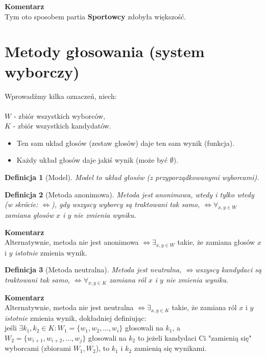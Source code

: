 \documentclass[12pt,a4paper]{article}
\theoremstyle{break}
\newcommand{\Komentarz}[1]{
	\begin{mdframed}[style=zadanie]
		\textbf{Komentarz}\\
		#1
	\end{mdframed}
	}
\newtheorem{definition}{Definicja}[section]
\newcommand{\witw}{$\Leftrightarrow$}
\begin{document}
\Komentarz{Tym oto sposobem partia \textbf{Sportowcy} zdobyła większość.}

	
\newpage

\section{Metody głosowania (system wyborczy)}

Wprowadźmy kilka oznaczeń, niech: \\
\\ $W$ - zbiór wszystkich wyborców, \\
$K$ - zbiór wszystkich kandydatów.
\begin{itemize}
	\item Ten sam układ głosów (zestaw głosów) daje ten sam wynik (funkcja).
	\item Każdy układ głosów daje jakiś wynik (może być $\emptyset$).
\end{itemize}

\begin{definition}[Model]
	Model to układ głosów (z przyporządkowanymi wyborcami).
\end{definition}

\begin{definition}[Metoda anonimowa]
	Metoda jest anonimowa, \textit{wtedy i tylko wtedy} (w skrócie: \witw), gdy wszyscy wyborcy są traktowani tak samo, \witw $\forall_{x,y \in W}$ zamiana głosów $x$ i $y$ nie zmienia wyniku.
\end{definition}

\Komentarz{Alternatywnie, metoda nie jest anonimowa \witw $\exists_{x,y \in W}$ takie, że zamiana głosów $x$ i $y$ \textit{istotnie} zmienia wynik.}

\begin{definition}[Metoda neutralna]
	Metoda jest neutralna, \witw wszyscy kandydaci są traktowani tak samo, \witw $\forall_{x,y \in K}$ zamiana ról $x$ i $y$ nie zmienia wyniku.
\end{definition}

\Komentarz{Alternatywnie, metoda nie jest neutralna \witw $\exists_{x,y \in K}$ takie, że zamiana ról $x$ i $y$ \textit{istotnie} zmienia wynik, dokładniej definiując:\\
jeśli $\exists{k_1,k_2\in K}: W_1=\{w_{1},w_{2},\dots,w_{i}\}$ głosowali na $k_1$, a $W_2=\{w_{i+1},w_{i+2},\dots,w_{j}\}$ głosowali na $k_2$ to jeżeli kandydaci Ci "zamienią się" wyborcami (zbiorami $W_1,W_2$), to $k_1$ i $k_2$ zamienią się wynikami.}
\end{document}
